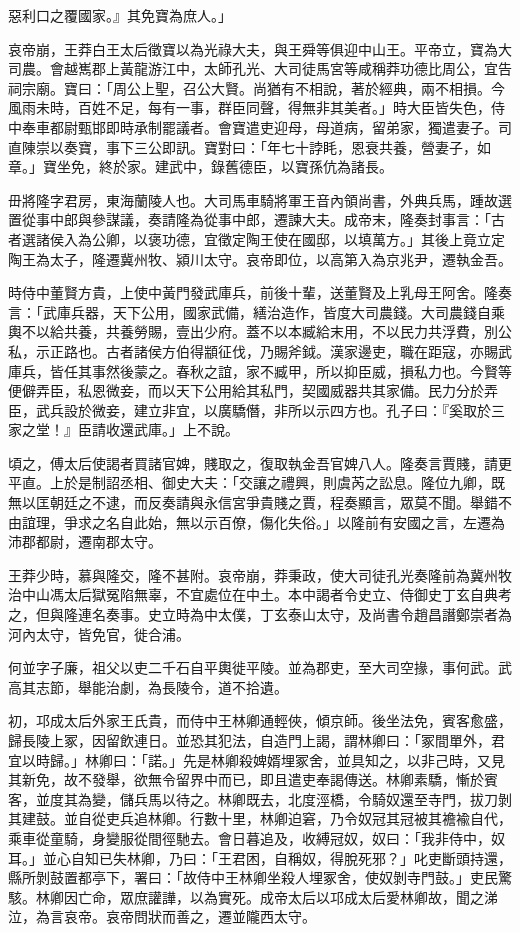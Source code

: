 \begin{pinyinscope}
惡利口之覆國家。』其免寶為庶人。」

哀帝崩，王莽白王太后徵寶以為光祿大夫，與王舜等俱迎中山王。平帝立，寶為大司農。會越嶲郡上黃龍游江中，太師孔光、大司徒馬宮等咸稱莽功德比周公，宜告祠宗廟。寶曰：「周公上聖，召公大賢。尚猶有不相說，著於經典，兩不相損。今風雨未時，百姓不足，每有一事，群臣同聲，得無非其美者。」時大臣皆失色，侍中奉車都尉甄邯即時承制罷議者。會寶遣吏迎母，母道病，留弟家，獨遣妻子。司直陳崇以奏寶，事下三公即訊。寶對曰：「年七十誖眊，恩衰共養，營妻子，如章。」寶坐免，終於家。建武中，錄舊德臣，以寶孫伉為諸長。

毌將隆字君房，東海蘭陵人也。大司馬車騎將軍王音內領尚書，外典兵馬，踵故選置從事中郎與參謀議，奏請隆為從事中郎，遷諫大夫。成帝末，隆奏封事言：「古者選諸侯入為公卿，以褒功德，宜徵定陶王使在國邸，以填萬方。」其後上竟立定陶王為太子，隆遷冀州牧、潁川太守。哀帝即位，以高第入為京兆尹，遷執金吾。

時侍中董賢方貴，上使中黃門發武庫兵，前後十輩，送董賢及上乳母王阿舍。隆奏言：「武庫兵器，天下公用，國家武備，繕治造作，皆度大司農錢。大司農錢自乘輿不以給共養，共養勞賜，壹出少府。蓋不以本臧給末用，不以民力共浮費，別公私，示正路也。古者諸侯方伯得顓征伐，乃賜斧鉞。漢家邊吏，職在距寇，亦賜武庫兵，皆任其事然後蒙之。春秋之誼，家不臧甲，所以抑臣威，損私力也。今賢等便僻弄臣，私恩微妾，而以天下公用給其私門，契國威器共其家備。民力分於弄臣，武兵設於微妾，建立非宜，以廣驕僭，非所以示四方也。孔子曰：『奚取於三家之堂！』臣請收還武庫。」上不說。

頃之，傅太后使謁者買諸官婢，賤取之，復取執金吾官婢八人。隆奏言賈賤，請更平直。上於是制詔丞相、御史大夫：「交讓之禮興，則虞芮之訟息。隆位九卿，既無以匡朝廷之不逮，而反奏請與永信宮爭貴賤之賈，程奏顯言，眾莫不聞。舉錯不由誼理，爭求之名自此始，無以示百僚，傷化失俗。」以隆前有安國之言，左遷為沛郡都尉，遷南郡太守。

王莽少時，慕與隆交，隆不甚附。哀帝崩，莽秉政，使大司徒孔光奏隆前為冀州牧治中山馮太后獄冤陷無辜，不宜處位在中土。本中謁者令史立、侍御史丁玄自典考之，但與隆連名奏事。史立時為中太僕，丁玄泰山太守，及尚書令趙昌譖鄭崇者為河內太守，皆免官，徙合浦。

何並字子廉，祖父以吏二千石自平輿徙平陵。並為郡吏，至大司空掾，事何武。武高其志節，舉能治劇，為長陵令，道不拾遺。

初，邛成太后外家王氏貴，而侍中王林卿通輕俠，傾京師。後坐法免，賓客愈盛，歸長陵上冢，因留飲連日。並恐其犯法，自造門上謁，謂林卿曰：「冢間單外，君宜以時歸。」林卿曰：「諾。」先是林卿殺婢婿埋冢舍，並具知之，以非己時，又見其新免，故不發舉，欲無令留界中而已，即且遣吏奉謁傳送。林卿素驕，慚於賓客，並度其為變，儲兵馬以待之。林卿既去，北度涇橋，令騎奴還至寺門，拔刀剝其建鼓。並自從吏兵追林卿。行數十里，林卿迫窘，乃令奴冠其冠被其襜褕自代，乘車從童騎，身變服從間徑馳去。會日暮追及，收縛冠奴，奴曰：「我非侍中，奴耳。」並心自知已失林卿，乃曰：「王君困，自稱奴，得脫死邪？」叱吏斷頭持還，縣所剝鼓置都亭下，署曰：「故侍中王林卿坐殺人埋冢舍，使奴剝寺門鼓。」吏民驚駭。林卿因亡命，眾庶讙譁，以為實死。成帝太后以邛成太后愛林卿故，聞之涕泣，為言哀帝。哀帝問狀而善之，遷並隴西太守。


\end{pinyinscope}
